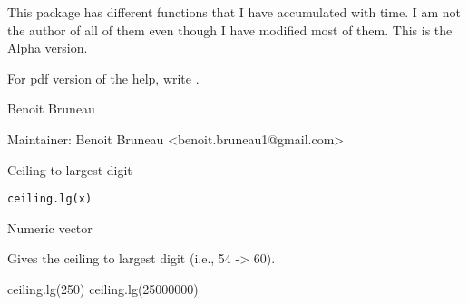 \documentclass[a4paper]{book}
\begin{document}
\newpage
{}
%
\begin{Description}\relax
This package has different functions that I have accumulated with time. I am not the author of all of them even though I have modified most of them. This is the Alpha version.
\end{Description}
%
\begin{Format}

\end{Format}
%
\begin{Details}\relax
For pdf version of the help, write .
\end{Details}
%
\begin{Author}\relax
Benoit Bruneau

Maintainer: Benoit Bruneau <benoit.bruneau1@gmail.com>

\end{Author}
\newpage
{}
%
\begin{Description}\relax
Ceiling to largest digit
\end{Description}
%
\begin{Usage}
\begin{verbatim}
ceiling.lg(x)
\end{verbatim}
\end{Usage}
%
\begin{Arguments}
\begin{ldescription}
\item[\code{x }] Numeric vector

\end{ldescription}
\end{Arguments}
%
\begin{Details}\relax
Gives the  ceiling to largest digit (i.e., 54 -> 60).
\end{Details}
%
\begin{Examples}
\begin{ExampleCode}
ceiling.lg(250)
ceiling.lg(25000000)
\end{ExampleCode}
\end{Examples}
\end{document}
